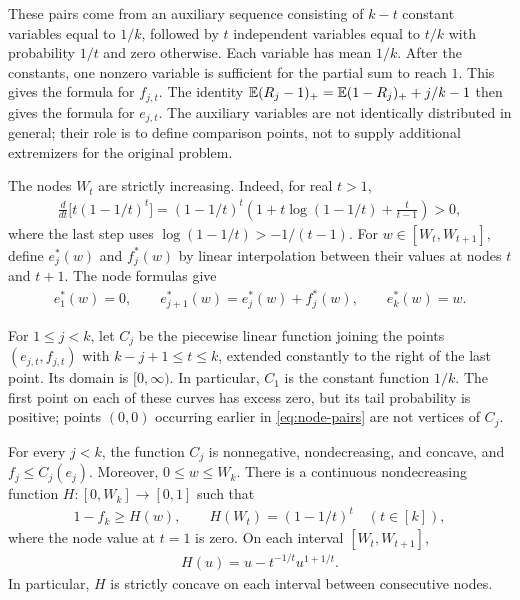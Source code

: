 These pairs come from an auxiliary sequence consisting of $k-t$ constant variables equal to $1/k$, followed by $t$ independent variables equal to $t/k$ with probability $1/t$ and zero otherwise. Each variable has mean $1/k$. After the constants, one nonzero variable is sufficient for the partial sum to reach $1$. This gives the formula for $f_{j,t}$. The identity $\mathbb E(R_j-1)_+=\mathbb E(1-R_j)_++j/k-1$ then gives the formula for $e_{j,t}$. The auxiliary variables are not identically distributed in general; their role is to define comparison points, not to supply additional extremizers for the original problem.

The nodes $W_t$ are strictly increasing. Indeed, for real $t>1$,
\begin{align*}
 \frac{d}{dt}\bigl[t(1-1/t)^t\bigr]
 =(1-1/t)^t\left(1+t\log(1-1/t)+\frac{t}{t-1}\right)>0,
\end{align*}
where the last step uses $\log(1-1/t)>-1/(t-1)$. For $w\in[W_t,W_{t+1}]$, define $e_j^*(w)$ and $f_j^*(w)$ by linear interpolation between their values at nodes $t$ and $t+1$. The node formulas give
\begin{align}\label{eq:star-recursion}
 e_1^*(w)=0,
 \qquad e_{j+1}^*(w)=e_j^*(w)+f_j^*(w),
 \qquad e_k^*(w)=w.
\end{align}

For $1\le j<k$, let $C_j$ be the piecewise linear function joining the points $(e_{j,t},f_{j,t})$ with $k-j+1\le t\le k$, extended constantly to the right of the last point. Its domain is $[0,\infty)$. In particular, $C_1$ is the constant function $1/k$. The first point on each of these curves has excess zero, but its tail probability is positive; points $(0,0)$ occurring earlier in \cref{eq:node-pairs} are not vertices of $C_j$.

\begin{lemma}\label{lem:envelopes}
For every $j<k$, the function $C_j$ is nonnegative, nondecreasing, and concave, and $f_j\le C_j(e_j)$. Moreover, $0\le w\le W_k$. There is a continuous nondecreasing function $H\colon[0,W_k]\to[0,1]$ such that
\begin{align}\label{eq:failure-envelope}
 1-f_k\ge H(w),
 \qquad H(W_t)=(1-1/t)^t\quad(t\in[k]),
\end{align}
where the node value at $t=1$ is zero. On each interval $[W_t,W_{t+1}]$,
\begin{align}\label{eq:H-piece}
 H(u)=u-t^{-1/t}u^{1+1/t}.
\end{align}
In particular, $H$ is strictly concave on each interval between consecutive nodes.
\end{lemma}

